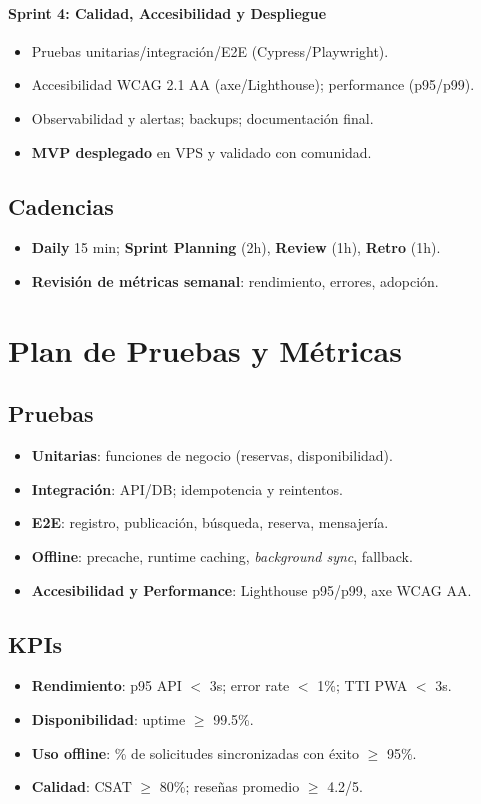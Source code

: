 \documentclass[12pt]{article}
\begin{document}
\paragraph{Sprint 4: Calidad, Accesibilidad y Despliegue}
\begin{itemize}[left=0pt, itemsep=2pt]
  \item Pruebas unitarias/integración/E2E (Cypress/Playwright).
  \item Accesibilidad WCAG 2.1 AA (axe/Lighthouse); performance (p95/p99).
  \item Observabilidad y alertas; backups; documentación final.
  \item \textbf{MVP desplegado} en VPS y validado con comunidad.
\end{itemize}

\subsection{Cadencias}
\begin{itemize}[left=0pt, itemsep=4pt]
  \item \textbf{Daily} 15 min; \textbf{Sprint Planning} (2h), \textbf{Review} (1h), \textbf{Retro} (1h).
  \item \textbf{Revisión de métricas semanal}: rendimiento, errores, adopción.
\end{itemize}

\section{Plan de Pruebas y Métricas}
\subsection{Pruebas}
\begin{itemize}[left=0pt, itemsep=4pt]
  \item \textbf{Unitarias}: funciones de negocio (reservas, disponibilidad).
  \item \textbf{Integración}: API/DB; idempotencia y reintentos.
  \item \textbf{E2E}: registro, publicación, búsqueda, reserva, mensajería.
  \item \textbf{Offline}: precache, runtime caching, \textit{background sync}, fallback.
  \item \textbf{Accesibilidad y Performance}: Lighthouse p95/p99, axe WCAG AA.
\end{itemize}

\subsection{KPIs}
\begin{itemize}[left=0pt, itemsep=4pt]
  \item \textbf{Rendimiento}: p95 API $<$ 3s; error rate $<$ 1\%; TTI PWA $<$ 3s.
  \item \textbf{Disponibilidad}: uptime $\geq$ 99.5\%.
  \item \textbf{Uso offline}: \% de solicitudes sincronizadas con éxito $\geq$ 95\%.
  \item \textbf{Calidad}: CSAT $\geq$ 80\%; reseñas promedio $\geq$ 4.2/5.
\end{itemize}
\end{document}
